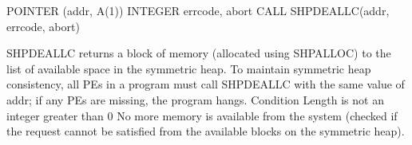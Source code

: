 
\synF   %

       POINTER (addr, A(1))
       INTEGER errcode, abort
       CALL SHPDEALLC(addr, errcode, abort)

 {
       SHPDEALLC  returns  a block of memory (allocated using SHPALLOC) to the
       list of available space in the symmetric heap.  To  maintain  symmetric
       heap  consistency, all \ac{PE}s in a program must call
       SHPDEALLC with the same value of addr; if  any  \ac{PE}s  are	 missing,  the
       program hangs.
  }
{
{}
\desR{ }
 {Condition}
 {Length is not an integer greater than 0}
 { No more memory is available from the system (checked  if the  request  cannot  be	satisfied from the available blocks on the symmetric heap).}
}%
\notesB{ }   
\eAPI 